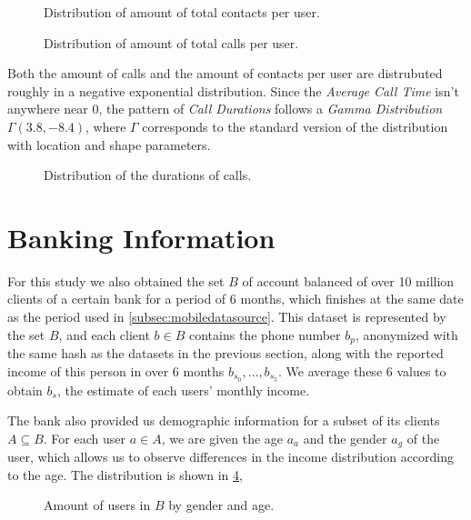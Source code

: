 \begin{figure}
\centering
{}
\caption{Distribution of amount of total contacts per user.}
\label{fig:outcalls_dist}
\end{figure}

\begin{figure}
\centering
{}
\caption{Distribution of amount of total calls per user.}
\label{fig:outcontacts_dist}
\end{figure}

Both the amount of calls and the amount of contacts per user are distrubuted roughly in a negative exponential distribution. Since the \emph{Average Call Time} isn't anywhere near 0, the pattern of \emph{Call Durations} follows a \emph{Gamma Distribution} $\Gamma \left( 3.8, -8.4 \right)$, where $\Gamma$ corresponds to the standard version of the distribution with location and shape parameters.

\begin{figure}
\centering
{}
\caption{Distribution of the durations of calls.}
\label{fig:callduration}
\end{figure}

\section{Banking Information}
\label{subsec:bank_source}

For this study we also obtained the set $B$ of account balanced of over 10 million clients of a certain bank for a period of 6 months, which finishes at the same date as the period used in \cref{subsec:mobiledatasource}. This dataset is represented by the set $B$, and each client $b \in B$ contains the phone number $b_p$, anonymized with the same hash as the datasets in the previous section, along with the reported income of this person in over 6 months $b_{s_0}, \ldots, b_{s_5}$. We average these 6 values to obtain $b_s$, the estimate of each users' monthly income.

The bank also provided us demographic information for a subset of its clients $A \subseteq B$. For each user $a \in A$, we are given the age $a_a$ and the gender $a_g$ of the user, which allows us to observe differences in the income distribution according to the age. The distribution is shown in \cref{fig:gender_age_bar}, 

\begin{figure}
\centering
{}
\caption{Amount of users in $B$ by gender and age.}
\label{fig:gender_age_bar}
\end{figure}

